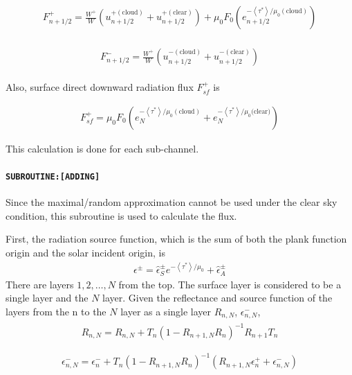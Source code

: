 \begin{eqnarray}
\begin{array}{c}
F_{n+1 / 2}^{+}=\frac{W^{+}}{W}\left(u_{n+1 / 2}^{+(\text{cloud})}+u_{n+1 / 2}^{+(\text{clear})}\right)+\mu_{0} F_{0}\left(e_{n+1 / 2}^{-\left\langle\tau^{*}\right\rangle / \mu_{0}(\text {cloud})}\right)
\end{array}
\end{eqnarray}

\begin{eqnarray}
\begin{array}{c}
F_{n+1 / 2}^{-}=\frac{W^{+}}{W}\left(u_{n+1 / 2}^{-(\text{cloud})}+u_{n+1 / 2}^{-(\text {clear})}\right)
\end{array}
\end{eqnarray}

Also, surface direct downward radiation flux \(F_{s f}^{+}\) is

\begin{eqnarray}
F_{s f}^{+}=\mu_{0} F_{0}\left(e_{N}^{-\left\langle\tau^{*}\right\rangle / \mu_{0}(\text {cloud})}+e_{N}^{-\left\langle\tau^{*}\right\rangle / \mu_{0} \text{(clear)}}\right)
\end{eqnarray}

This calculation is done for each sub-channel.

\hypertarget{subroutineadding}{%
\paragraph{\texorpdfstring{\texttt{SUBROUTINE:{[}ADDING{]}}}{SUBROUTINE:{[}ADDING{]}}}\label{subroutineadding}}

Since the maximal/random approximation cannot be used under the clear sky condition, this subroutine is used to calculate the flux.

First, the radiation source function, which is the sum of both the plank function origin and the solar incident origin, is \begin{eqnarray}
\epsilon^{\pm}=\hat{\epsilon}_{S}^{\pm} e^{-\left\langle\tau^{*}\right\rangle / \mu_{0}}+\hat{\epsilon}_{A}^{\pm}
\end{eqnarray} There are layers \(1, 2,\dots, N\) from the top. The surface layer is considered to be a single layer and the \(N\) layer. Given the reflectance and source function of the layers from the n to the
\(N\) layer as a single layer \(R_{n, N}\), \(\epsilon_{n, N}^{-}\), \begin{eqnarray}
\begin{array}{c}
R_{n, N}=R_{n, N}+T_{n}\left(1-R_{n+1, N} R_{n}\right)^{-1} R_{n+1} T_{n} \\
\end{array}
\end{eqnarray} \begin{eqnarray}
\begin{array}{c}
\epsilon_{n, N}^{-}=\epsilon_{n}^{-}+T_{n}\left(1-R_{n+1, N} R_{n}\right)^{-1}\left(R_{n+1, N} \epsilon_{n}^{+}+\epsilon_{n, N}^{-}\right)
\end{array}
\end{eqnarray}

